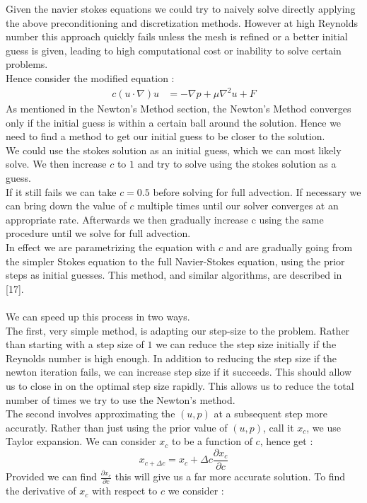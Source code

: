 \documentclass[11pt,twoside,a4paper]{article}
\begin{document}
Given the navier stokes equations we could try to naively solve directly applying the above preconditioning and discretization methods. However at high Reynolds number this approach quickly fails unless the mesh is refined or a better initial guess is given, leading to high computational cost or inability to solve certain problems.\\
Hence consider the modified equation :
\begin{align}
c (u \cdot \nabla) u &= -\nabla p + \mu \nabla^2 u + F
\end{align}
As mentioned in the Newton's Method section, the Newton's Method converges only if the initial guess is within a certain ball around the solution. Hence we need to find a method to get our initial guess to be closer to the solution.\\
We could use the stokes solution as an initial guess, which we can most likely solve. We then increase $c$ to $1$ and try to solve using the stokes solution as a guess. \\
If it still fails we can take $c =0.5$ before solving for full advection. If necessary we can bring down the value of $c$ multiple times until our solver converges at an appropriate rate. Afterwards we then gradually increase c using the same procedure until we solve for full advection.\\
In effect we are parametrizing the equation with $c$ and are gradually going from the simpler Stokes equation to the full Navier-Stokes equation, using the prior steps as initial guesses. This method, and similar algorithms, are described in [17].\\
\\
We can speed up this process in two ways.\\
The first, very simple method, is adapting our step-size to the problem. Rather than starting with a step size of $1$ we can reduce the step size initially if the Reynolds number is high enough. In addition to reducing the step size if the newton iteration fails, we can increase step size if it succeeds. This should allow us to close in on the optimal step size rapidly. This allows us to reduce the total number of times we try to use the Newton's method.\\
The second involves approximating the $(u,p)$ at a subsequent step more accuratly. Rather than just using the prior value of $(u,p)$, call it $x_c$, we use Taylor expansion. We can consider $x_c$ to be a function of $c$, hence get :
$$
x_{c+\Delta c} = x_c + \Delta c \frac{\partial x_c}{\partial c}
$$
Provided we can find $\frac{\partial x_c}{\partial c}$ this will give us a far more accurate solution.
To find the derivative of $x_c$ with respect to $c$ we consider :\\
\end{document}
